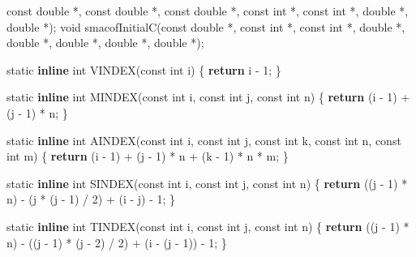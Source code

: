 \documentclass[12pt,]{article}
\newenvironment{Shaded}{\begin{snugshade}}{\end{snugshade}}
\newcommand{\KeywordTok}[1]{\textcolor[rgb]{0.13,0.29,0.53}{\textbf{#1}}}
\newcommand{\DataTypeTok}[1]{\textcolor[rgb]{0.13,0.29,0.53}{#1}}
\newcommand{\DecValTok}[1]{\textcolor[rgb]{0.00,0.00,0.81}{#1}}
\newcommand{\ControlFlowTok}[1]{\textcolor[rgb]{0.13,0.29,0.53}{\textbf{#1}}}
\newcommand{\NormalTok}[1]{#1}
\begin{document}
\begin{Shaded}
\begin{Highlighting}[]
                    \DataTypeTok{const} \DataTypeTok{double}\NormalTok{ *, }\DataTypeTok{const} \DataTypeTok{double}\NormalTok{ *, }\DataTypeTok{const} \DataTypeTok{double}\NormalTok{ *, }\DataTypeTok{const} \DataTypeTok{int}\NormalTok{ *,}
                    \DataTypeTok{const} \DataTypeTok{int}\NormalTok{ *, }\DataTypeTok{double}\NormalTok{ *, }\DataTypeTok{double}\NormalTok{ *);}
\DataTypeTok{void}\NormalTok{ smacofInitialC(}\DataTypeTok{const} \DataTypeTok{double}\NormalTok{ *, }\DataTypeTok{const} \DataTypeTok{int}\NormalTok{ *, }\DataTypeTok{const} \DataTypeTok{int}\NormalTok{ *, }\DataTypeTok{double}\NormalTok{ *,}
                    \DataTypeTok{double}\NormalTok{ *, }\DataTypeTok{double}\NormalTok{ *, }\DataTypeTok{double}\NormalTok{ *, }\DataTypeTok{double}\NormalTok{ *);}

\DataTypeTok{static} \KeywordTok{inline} \DataTypeTok{int}\NormalTok{ VINDEX(}\DataTypeTok{const} \DataTypeTok{int}\NormalTok{ i) \{ }\ControlFlowTok{return}\NormalTok{ i - }\DecValTok{1}\NormalTok{; \}}

\DataTypeTok{static} \KeywordTok{inline} \DataTypeTok{int}\NormalTok{ MINDEX(}\DataTypeTok{const} \DataTypeTok{int}\NormalTok{ i, }\DataTypeTok{const} \DataTypeTok{int}\NormalTok{ j, }\DataTypeTok{const} \DataTypeTok{int}\NormalTok{ n) \{}
    \ControlFlowTok{return}\NormalTok{ (i - }\DecValTok{1}\NormalTok{) + (j - }\DecValTok{1}\NormalTok{) * n;}
\NormalTok{\}}

\DataTypeTok{static} \KeywordTok{inline} \DataTypeTok{int}\NormalTok{ AINDEX(}\DataTypeTok{const} \DataTypeTok{int}\NormalTok{ i, }\DataTypeTok{const} \DataTypeTok{int}\NormalTok{ j, }\DataTypeTok{const} \DataTypeTok{int}\NormalTok{ k, }\DataTypeTok{const} \DataTypeTok{int}\NormalTok{ n,}
                         \DataTypeTok{const} \DataTypeTok{int}\NormalTok{ m) \{}
    \ControlFlowTok{return}\NormalTok{ (i - }\DecValTok{1}\NormalTok{) + (j - }\DecValTok{1}\NormalTok{) * n + (k - }\DecValTok{1}\NormalTok{) * n * m;}
\NormalTok{\}}

\DataTypeTok{static} \KeywordTok{inline} \DataTypeTok{int}\NormalTok{ SINDEX(}\DataTypeTok{const} \DataTypeTok{int}\NormalTok{ i, }\DataTypeTok{const} \DataTypeTok{int}\NormalTok{ j, }\DataTypeTok{const} \DataTypeTok{int}\NormalTok{ n) \{}
    \ControlFlowTok{return}\NormalTok{ ((j - }\DecValTok{1}\NormalTok{) * n) - (j * (j - }\DecValTok{1}\NormalTok{) / }\DecValTok{2}\NormalTok{) + (i - j) - }\DecValTok{1}\NormalTok{;}
\NormalTok{\}}

\DataTypeTok{static} \KeywordTok{inline} \DataTypeTok{int}\NormalTok{ TINDEX(}\DataTypeTok{const} \DataTypeTok{int}\NormalTok{ i, }\DataTypeTok{const} \DataTypeTok{int}\NormalTok{ j, }\DataTypeTok{const} \DataTypeTok{int}\NormalTok{ n) \{}
    \ControlFlowTok{return}\NormalTok{ ((j - }\DecValTok{1}\NormalTok{) * n) - ((j - }\DecValTok{1}\NormalTok{) * (j - }\DecValTok{2}\NormalTok{) / }\DecValTok{2}\NormalTok{) + (i - (j - }\DecValTok{1}\NormalTok{)) - }\DecValTok{1}\NormalTok{;}
\NormalTok{\}}


\end{Highlighting}
\end{Shaded}
\end{document}
